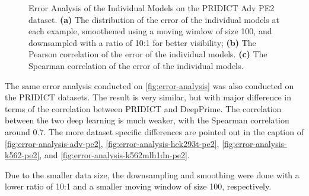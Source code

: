 \begin{figure}[ht]
    \centering
    \caption[Error Analysis of the Individual Models on PRIDICT Adv PE2 dataset]{Error Analysis of the Individual Models on the PRIDICT Adv PE2 dataset. \textbf{(a)} The distribution of the error of the individual models at each example, smoothened using a moving window of size 100, and downsampled with a ratio of 10:1 for better visibility; \textbf{(b)} The Pearson correlation of the error of the individual models. \textbf{(c)} The Spearman correlation of the error of the individual models.}
    \label{fig:error-analysis-adv-pe2}
\end{figure}

The same error analysis conducted on \autoref{fig:error-analysis} was also conducted on the PRIDICT datasets. The result is very similar, but with major difference in terms of the correlation between PRIDICT and DeepPrime. The correlation between the two deep learning is much weaker, with the Spearman correlation around 0.7. The more dataset specific differences are pointed out in the caption of \autoref{fig:error-analysis-adv-pe2}, \autoref{fig:error-analysis-hek293t-pe2}, \autoref{fig:error-analysis-k562-pe2}, and \autoref{fig:error-analysis-k562mlh1dn-pe2}.

Due to the smaller data size, the downsampling and smoothing were done with a lower ratio of 10:1 and a smaller moving window of size 100, respectively. 


